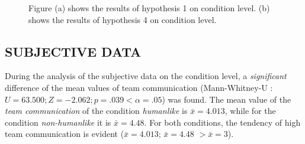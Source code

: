 \documentclass[sigchi]{acmart}
\begin{document}
\begin{figure}[]
  \centering
  \qquad
  \caption[Results of hypothesis 1 and 4]{Figure (a) shows the results of hypothesis 1 on condition level. (b) shows the results of hypothesis 4 on condition level.}
  \label{H1H4}
\end{figure}

\newpage
\subsection{SUBJECTIVE DATA}
During the analysis of the subjective data on the condition level, a \textit{significant} difference of the mean values of team communication (Mann-Whitney-U : $U = 63.500; Z = -2.062; p =.039 < \alpha = .05$) was found. The mean value of the \textit{team communication} of the condition \textit{humanlike} is $\bar{x} = 4.013$, while for the condition \textit{non-humanlike} it is  $\bar{x} = 4.48$. For both conditions, the tendency of high team communication is evident ($\bar{x} = 4.013$; $\bar{x} = 4.48$ $ > \bar{x} = 3$).
\end{document}
